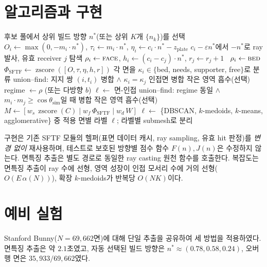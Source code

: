 \documentclass[11pt,a4paper]{article}
\begin{document}
\section{알고리즘과 구현}

\begin{algorithm}[H]
\caption{출력지향 메쉬 분할}
\begin{algorithmic}[1]
\State 후보 풀에서 상위 빌드 방향 $n^\ast$(또는 상위 $K$개 $\{n_k\}$)를 선택
  \State $O_i\gets\max(0,-m_i\cdot n^\ast)$, $\tau_i\gets m_i\cdot n^\ast$,
         $\eta_i\gets c_i\cdot n^\ast-z_{\mathrm{plate}}$
\EndFor
{}
  \State $c_i-\varepsilon n^\ast$에서 $-n^\ast$로 ray 발사, 유효 receiver $j$ 탐색
   $\rho_i\gets\textsc{face}$, $h_i\gets(c_i-c_j)\cdot n^\ast$, $r_j\gets r_j+1$
  \Else\ $\rho_i\gets\textsc{bed}$ \EndIf
\EndFor
\State $\Phi_{\mathrm{SFTF}}\gets\operatorname{zscore}([O,\tau,\eta,h,r])$
  \State 각 면을 $\kappa_i\in\{$bed, needs, supporter, free$\}$로 분류
  \State union--find: 지지 쌍 $(i,t_i)$ 병합 $\wedge$ $\kappa_i{=}\kappa_j$ 인접면 병합
  \State 작은 영역 흡수(선택)
  \State regime $\gets \rho$ (또는 다방향 $b$)
  \State $\ell\gets$ 면-인접 union--find: regime 동일 $\wedge$ $m_i\cdot m_j\ge\cos\theta_{\mathrm{sim}}$일 때 병합
  \State 작은 영역 흡수(선택)
\Else{}
  \State $M\gets[w_s\,\operatorname{zscore}(C)\mid w_f\,\Phi_{\mathrm{SFTF}}\mid w_d\,W]$
  \State $\ell\gets$ \{DBSCAN, $k$-medoids, $k$-means, agglomerative\} 중 적용
\EndIf
\State \Return 면별 라벨 $\ell$; 라벨별 submesh로 분리
\end{algorithmic}
\end{algorithm}

구현은 기존 SFTF 모듈의 헬퍼(표면 데이터 캐시, ray sampling, 유효 hit 판정)를
\emph{변경 없이} 재사용하며, 테스트로 보호된 방향별 점수 함수
$F(n),J(n)$은 수정하지 않는다.
면특징 추출은 별도 경로로 동일한 ray casting 원천 함수를 호출한다.
복잡도는 면특징 추출이 ray 수에 선형,
영역 성장이 인접 모서리 수에 거의 선형($O(E\,\alpha(N))$),
확장 $k$-medoids가 반복당 $O(NK)$이다.

\section{예비 실험}
\label{sec:exp}

Stanford Bunny($N=69{,}662$면)에 대해 단일 추출을 공유하여 세 방법을 적용하였다.
면특징 추출은 약 $2.1$초였고,
자동 선택된 빌드 방향은 $n^\ast\approx(0.78,0.58,0.24)$,
오버행 면은 $35{,}933/69{,}662$였다.
\end{document}
